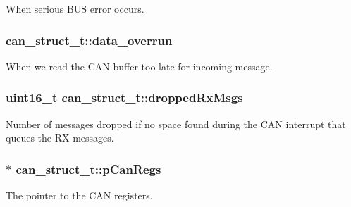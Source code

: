 When serious B\+US error occurs. 

\subsubsection[{\texorpdfstring{data\+\_\+overrun}{data_overrun}}]{ can\+\_\+struct\+\_\+t\+::data\+\_\+overrun}\hypertarget{structcan__struct__t_a91068e55e2923ef1bdf723e11d5460f1}{}\label{structcan__struct__t_a91068e55e2923ef1bdf723e11d5460f1}


When we read the C\+AN buffer too late for incoming message. 

\subsubsection[{\texorpdfstring{dropped\+Rx\+Msgs}{droppedRxMsgs}}]{\setlength{\rightskip}{0pt plus 5cm}uint16\+\_\+t can\+\_\+struct\+\_\+t\+::dropped\+Rx\+Msgs}\hypertarget{structcan__struct__t_a2e7319422bed45d0521764d1f6644ae1}{}\label{structcan__struct__t_a2e7319422bed45d0521764d1f6644ae1}


Number of messages dropped if no space found during the C\+AN interrupt that queues the RX messages. 

\subsubsection[{\texorpdfstring{p\+Can\+Regs}{pCanRegs}}]{$\ast$ can\+\_\+struct\+\_\+t\+::p\+Can\+Regs}\hypertarget{structcan__struct__t_ac1798cad8cd1b75402e953a7cc5d2b50}{}\label{structcan__struct__t_ac1798cad8cd1b75402e953a7cc5d2b50}


The pointer to the C\+AN registers. 

